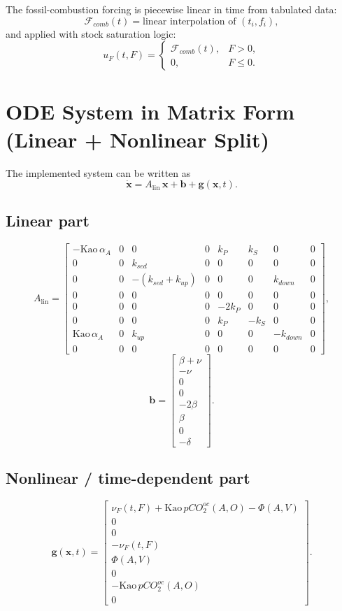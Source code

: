 \documentclass[11pt,a4paper]{article}
\begin{document}
The fossil-combustion forcing is piecewise linear in time from tabulated data:
\[
\mathcal{F}_{comb}(t)=\text{linear interpolation of }(t_i, f_i),
\]
and applied with stock saturation logic:
\[
u_F(t,F)=
\begin{cases}
\mathcal{F}_{comb}(t), & F>0,\\
0, & F\le 0.
\end{cases}
\]

\section{ODE System in Matrix Form (Linear + Nonlinear Split)}
The implemented system can be written as
\[
\dot{\bm{x}} = A_{\mathrm{lin}}\,\bm{x} + \bm{b} + \bm{g}(\bm{x},t).
\]

\subsection*{Linear part}
\[
A_{\mathrm{lin}}=
\begin{bmatrix}
-\mathrm{Kao}\,\alpha_A & 0 & 0 & 0 & k_P & k_S & 0 & 0\\
0 & 0 & k_{sed} & 0 & 0 & 0 & 0 & 0\\
0 & 0 & -(k_{sed}+k_{up}) & 0 & 0 & 0 & k_{down} & 0\\
0 & 0 & 0 & 0 & 0 & 0 & 0 & 0\\
0 & 0 & 0 & 0 & -2k_P & 0 & 0 & 0\\
0 & 0 & 0 & 0 & k_P & -k_S & 0 & 0\\
\mathrm{Kao}\,\alpha_A & 0 & k_{up} & 0 & 0 & 0 & -k_{down} & 0\\
0 & 0 & 0 & 0 & 0 & 0 & 0 & 0
\end{bmatrix},
\]
\[
\bm{b}=
\begin{bmatrix}
\beta+\nu\\
-\nu\\
0\\
0\\
-2\beta\\
\beta\\
0\\
-\delta
\end{bmatrix}.
\]

\subsection*{Nonlinear / time-dependent part}
\[
\bm{g}(\bm{x},t)=
\begin{bmatrix}
\nu_F(t,F)+\mathrm{Kao}\,pCO_2^{oc}(A,O)-\Phi(A,V)\\
0\\
0\\
-\nu_F(t,F)\\
\Phi(A,V)\\
0\\
-\mathrm{Kao}\,pCO_2^{oc}(A,O)\\
0
\end{bmatrix}.
\]
\end{document}
